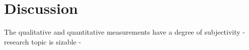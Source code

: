 \chapter{Discussion}

The qualitative and quantitative measurements have a degree of subjectivity
- research topic is sizable
- 






